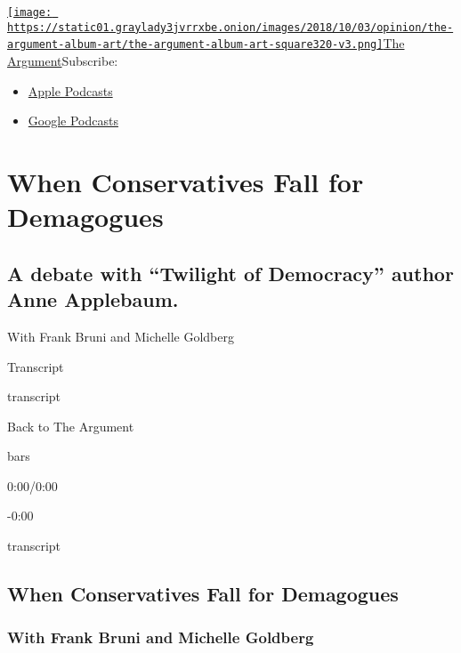 \href{https://www.nytimes3xbfgragh.onion/column/the-argument}{\texttt{[image: https://static01.graylady3jvrrxbe.onion/images/2018/10/03/opinion/the-argument-album-art/the-argument-album-art-square320-v3.png]}The
Argument}Subscribe:

\begin{itemize}
\tightlist
\item
  \href{https://itunes.apple.com/us/podcast/id1438024613}{Apple
  Podcasts}
\item
  \href{https://www.google.com/podcasts?feed=aHR0cHM6Ly9yc3MuYXJ0MTkuY29tL3RoZS1hcmd1bWVudA\%3D\%3D}{Google
  Podcasts}
\end{itemize}

\hypertarget{when-conservatives-fall-for-demagogues-1}{%
\section{When Conservatives Fall for
Demagogues}\label{when-conservatives-fall-for-demagogues-1}}

\hypertarget{a-debate-with-twilight-of-democracy-author-anne-applebaum-1}{%
\subsection{A debate with ``Twilight of Democracy'' author Anne
Applebaum.}\label{a-debate-with-twilight-of-democracy-author-anne-applebaum-1}}

With Frank Bruni and Michelle Goldberg

Transcript

transcript

Back to The Argument

bars

0:00/0:00

-0:00

transcript

\hypertarget{when-conservatives-fall-for-demagogues-2}{%
\subsection{When Conservatives Fall for
Demagogues}\label{when-conservatives-fall-for-demagogues-2}}

\hypertarget{with-frank-bruni-and-michelle-goldberg-1}{%
\subsubsection{With Frank Bruni and Michelle
Goldberg}\label{with-frank-bruni-and-michelle-goldberg-1}}


